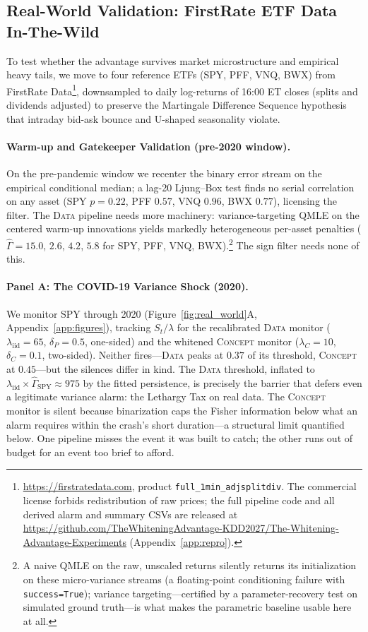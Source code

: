 \documentclass[sigconf,anonymous,review]{acmart}
\theoremstyle{acmdefinition}
\begin{document}
\subsection{Real-World Validation: FirstRate ETF Data In-The-Wild}\label{sec:real_world}

To test whether the advantage survives market microstructure and empirical heavy tails, we move to four reference ETFs (SPY, PFF, VNQ, BWX) from FirstRate Data\footnote{\url{https://firstratedata.com}, product \texttt{full\_1min\_adjsplitdiv}. The commercial license forbids redistribution of raw prices; the full pipeline code and all derived alarm and summary CSVs are released at \url{https://github.com/TheWhiteningAdvantage-KDD2027/The-Whitening-Advantage-Experiments} (Appendix~\ref{app:repro}).}, downsampled to daily log-returns of 16:00 ET closes (splits and dividends adjusted) to preserve the Martingale Difference Sequence hypothesis that intraday bid-ask bounce and U-shaped seasonality violate.

\paragraph{Warm-up and Gatekeeper Validation (pre-2020 window).}
On the pre-pandemic window we recenter the binary error stream on the empirical conditional median; a lag-20 Ljung--Box test finds no serial correlation on any asset (SPY $p=0.22$, PFF $0.57$, VNQ $0.96$, BWX $0.77$), licensing the filter. The \textsc{Data} pipeline needs more machinery: variance-targeting QMLE on the centered warm-up innovations yields markedly heterogeneous per-asset penalties ($\hat{\Gamma} = 15.0$, $2.6$, $4.2$, $5.8$ for SPY, PFF, VNQ, BWX).\footnote{A naive QMLE on the raw, unscaled returns silently returns its initialization on these micro-variance streams (a floating-point conditioning failure with \texttt{success=True}); variance targeting---certified by a parameter-recovery test on simulated ground truth---is what makes the parametric baseline usable here at all.} The sign filter needs none of this.

\paragraph{Panel A: The COVID-19 Variance Shock (2020).}
We monitor SPY through 2020 (Figure~\ref{fig:real_world}A, Appendix~\ref{app:figures}), tracking $S_t/\lambda$ for the recalibrated \textsc{Data} monitor ($\lambda_{\mathrm{iid}} = 65$, $\delta_P = 0.5$, one-sided) and the whitened \textsc{Concept} monitor ($\lambda_C = 10$, $\delta_C = 0.1$, two-sided). Neither fires---\textsc{Data} peaks at $0.37$ of its threshold, \textsc{Concept} at $0.45$---but the silences differ in kind. The \textsc{Data} threshold, inflated to $\lambda_{\mathrm{iid}} \times \hat{\Gamma}_{\mathrm{SPY}} \approx 975$ by the fitted persistence, is precisely the barrier that defers even a legitimate variance alarm: the Lethargy Tax on real data. The \textsc{Concept} monitor is silent because binarization caps the Fisher information below what an alarm requires within the crash's short duration---a structural limit quantified below. One pipeline misses the event it was built to catch; the other runs out of budget for an event too brief to afford.
\end{document}

